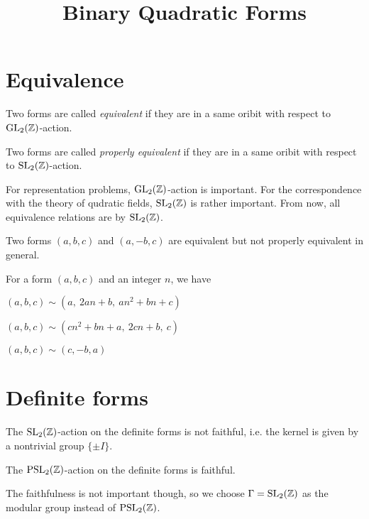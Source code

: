 \documentclass{../exp}
\title{Binary Quadratic Forms}
\begin{document}
\maketitle

\section{Equivalence}


\begin{defn}
Two forms are called \emph{equivalent} if they are in a same oribit with respect to $\mathrm{GL}_2(\mathbb{Z})$-action.
\end{defn}

\begin{defn}
Two forms are called \emph{properly equivalent} if they are in a same oribit with respect to $\mathrm{SL}_2(\mathbb{Z})$-action.
\end{defn}

For representation problems, $\mathrm{GL}_2(\mathbb{Z})$-action is important.
For the correspondence with the theory of qudratic fields, $\mathrm{SL}_2(\mathbb{Z})$ is rather important.
From now, all equivalence relations are by $\mathrm{SL}_2(\mathbb{Z})$.

\begin{ex}
Two forms $(a,b,c)$ and $(a,-b,c)$ are equivalent but not properly equivalent in general.
\end{ex}
\begin{lem}
For a form $(a,b,c)$ and an integer $n$, we have
\begin{cond}
\item $(a,b,c)\sim(a,\ 2an+b,\ an^2+bn+c)$
\item $(a,b,c)\sim(cn^2+bn+a,\ 2cn+b,\ c)$
\item $(a,b,c)\sim(c,-b,a)$
\end{cond}
\end{lem}

\section{Definite forms}

\begin{prop}
The $\mathrm{SL}_2(\mathbb{Z})$-action on the definite forms is not faithful, i.e. the kernel is given by a nontrivial group $\{\pm I\}$.
\end{prop}
\begin{prop}
The $\mathrm{PSL}_2(\mathbb{Z})$-action on the definite forms is faithful.
\end{prop}
The faithfulness is not important though, so we choose $\Gamma=\mathrm{SL}_2(\mathbb{Z})$ as the modular group instead of $\mathrm{PSL}_2(\mathbb{Z})$.
\end{document}
